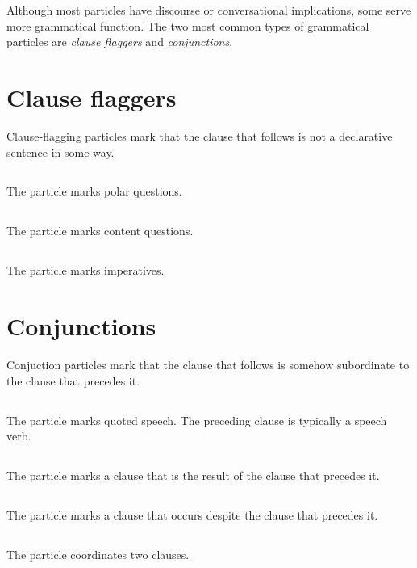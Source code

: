 Although most particles have discourse or conversational implications, some serve more grammatical function. The two most common types of grammatical particles are \emph{clause flaggers} and \emph{conjunctions}.

\section{Clause flaggers}
Clause-flagging particles mark that the clause that follows is not a declarative sentence in some way.

\subsection{}
The particle  marks polar questions.

\subsection{}
The particle  marks content questions.

\subsection{}
The particle  marks imperatives.

\section{Conjunctions}
Conjuction particles mark that the clause that follows is somehow subordinate to the clause that precedes it.

\subsection{}
The particle  marks quoted speech. The preceding clause is typically a speech verb.

\subsection{}
The particle  marks a clause that is the result of the clause that precedes it.

\subsection{}
The particle  marks a clause that occurs despite the clause that precedes it.

\subsection{}
The particle  coordinates two clauses.